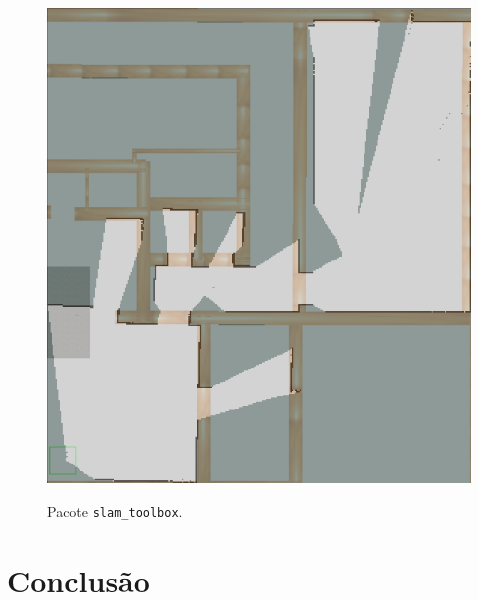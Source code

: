 \documentclass[repeatfields,xlists,xpacks,oneside,yearsonly]{ufrgscca}
\begin{document}
\begin{figure}[h]
        {
            \centering
            \caption{Pacote \texttt{slam\_toolbox}.}
            \label{fig:mapping_slam_toolbox}
            \includegraphics[width=0.6\linewidth]{slam_toolbox_map-compared.png}\\
        }
\end{figure}



\chapter{Conclusão}
\label{conclusao}


\printbibliography

%
%
%
\end{document}
